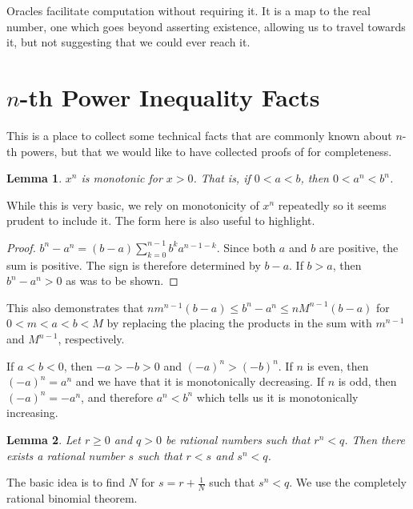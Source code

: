 \documentclass[12pt]{article}
\newtheorem{lemma}{Lemma}[subsection]
\begin{document}
Oracles facilitate computation without requiring it. It is a map to the real number, one which goes beyond asserting existence, allowing us to travel towards it, but not suggesting that we could ever reach it. 

\appendix

\section{\texorpdfstring{$n$}{n}-th Power Inequality Facts}\label{app:A}

This is a place to collect some technical facts that are commonly known about $n$-th powers, but that we would like to have collected proofs of for completeness.

\begin{lemma}
$x^n$ is monotonic for $x>0$. That is, if $0 < a < b$, then $0 < a^n<b^n$.
\end{lemma}

While this is very basic, we rely on monotonicity of $x^n$ repeatedly so it seems prudent to include it. The form here is also useful to highlight. 

\begin{proof}
$b^n-a^n= (b-a)\sum_{k=0}^{n-1} b^k a^{n-1-k}$. Since both $a$ and $b$ are positive, the sum is positive. The sign is therefore determined by $b-a$. If $b>a$, then $b^n-a^n > 0$ as was to be shown. 
\end{proof}

This also demonstrates that $ n m^{n-1} (b-a) \leq  b^n -a^n \leq n M^{n-1} (b-a)$ for $0 < m < a< b< M$ by replacing the placing the products in the sum with $m^{n-1}$ and $M^{n-1}$, respectively. 

If $ a< b< 0$, then $-a > -b > 0$ and $(-a)^n > (-b)^n$. If $n$ is even, then $(-a)^n = a^n$ and we have that it is monotonically decreasing. If $n$ is odd, then $(-a)^n = -a^n$, and therefore $a^n < b^n$ which tells us it is monotonically increasing. 

\begin{lemma}\label{app:lesser}
Let $r \geq 0 $ and $q > 0$ be rational numbers such that $r^n < q$. Then there exists a rational number $s$ such that $r < s$ and $s^n < q$.
\end{lemma}

The basic idea is to find $N$ for $s = r + \tfrac{1}{N}$ such that $s^n < q$. We use the completely rational binomial theorem.  
\end{document}
